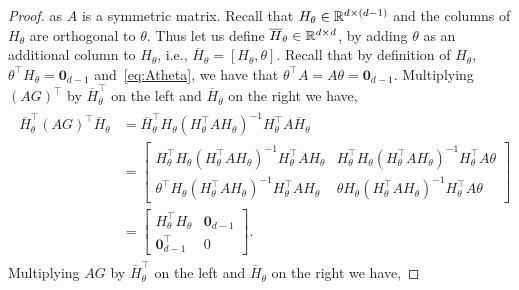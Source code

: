 \begin{proof}
as $A$ is a symmetric matrix. 
Recall that $H_\theta\in \mathbb{R}^{d\times (d-1)}$ and the columns of $H_\theta$ are orthogonal to $\theta$. Thus let us define $\overline{H}_\theta \in \mathbb{R}^{d\times d}$, by adding $\theta$ as an additional column to $H_\theta$, i.e., $\overline{H}_\theta= [H_\theta ,\theta]$. Recall that by definition of $H_\theta$, $\theta^\top H_\theta= \mathbf{0}_{d-1}$ and~\eqref{eq:Atheta}, we have that $\theta^\top A = A \theta=\mathbf{0}_{d-1}$. Multiplying $(AG)^\top$ by $\overline{H}^\top_\theta$ on the left and  $\overline{H}_\theta$ on the right we have,
\begin{align}\label{eq:AGtrans}
\begin{split}
\overline{H}^\top_\theta (AG)^\top \overline{H}_\theta &=\overline{H}^\top_\theta H_\theta(H_\theta^\top {A} H_\theta)^{-1} H_\theta^\top A \overline{H}_\theta\\
 &= \begin{bmatrix}
    H^\top_\theta H_\theta(H_\theta^\top {A} H_\theta)^{-1} H_\theta^\top A H_\theta &
   H^\top_\theta H_\theta(H_\theta^\top {A} H_\theta)^{-1} H_\theta^\top A \theta \\
   \theta^\top H_\theta(H_\theta^\top {A} H_\theta)^{-1} H_\theta^\top A H_\theta & 
   \theta H_\theta(H_\theta^\top {A} H_\theta)^{-1} H_\theta^\top A \theta
   \end{bmatrix}\\
&= \begin{bmatrix}
    H^\top_\theta H_\theta &
   \mathbf{0}_{d-1} \\
   \mathbf{0}_{d-1}^\top& 
   0
   \end{bmatrix}.
\end{split}
\end{align}
Multiplying $AG$ by $\overline{H}^\top_\theta$ on the left and  $\overline{H}_\theta$ on the right we have,



\end{proof}
